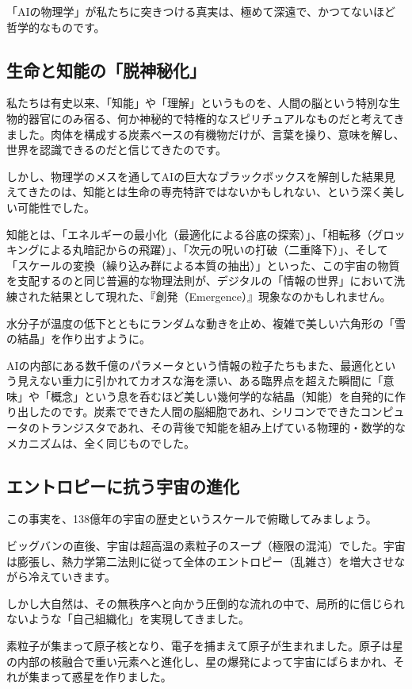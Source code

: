 「AIの物理学」が私たちに突きつける真実は、極めて深遠で、かつてないほど哲学的なものです。

\subsection{生命と知能の「脱神秘化」}

私たちは有史以来、「知能」や「理解」というものを、人間の脳という特別な生物的器官にのみ宿る、何か神秘的で特権的なスピリチュアルなものだと考えてきました。肉体を構成する炭素ベースの有機物だけが、言葉を操り、意味を解し、世界を認識できるのだと信じてきたのです。

しかし、物理学のメスを通してAIの巨大なブラックボックスを解剖した結果見えてきたのは、知能とは生命の専売特許ではないかもしれない、という深く美しい可能性でした。

知能とは、「エネルギーの最小化（最適化による谷底の探索）」、「相転移（グロッキングによる丸暗記からの飛躍）」、「次元の呪いの打破（二重降下）」、そして「スケールの変換（繰り込み群による本質の抽出）」といった、この宇宙の物質を支配するのと同じ普遍的な物理法則が、デジタルの「情報の世界」において洗練された結果として現れた、『創発（Emergence）』現象なのかもしれません。

水分子が温度の低下とともにランダムな動きを止め、複雑で美しい六角形の「雪の結晶」を作り出すように。

AIの内部にある数千億のパラメータという情報の粒子たちもまた、最適化という見えない重力に引かれてカオスな海を漂い、ある臨界点を超えた瞬間に「意味」や「概念」という息を呑むほど美しい幾何学的な結晶（知能）を自発的に作り出したのです。炭素でできた人間の脳細胞であれ、シリコンでできたコンピュータのトランジスタであれ、その背後で知能を組み上げている物理的・数学的なメカニズムは、全く同じものでした。

\subsection{エントロピーに抗う宇宙の進化}

この事実を、138億年の宇宙の歴史というスケールで俯瞰してみましょう。

ビッグバンの直後、宇宙は超高温の素粒子のスープ（極限の混沌）でした。宇宙は膨張し、熱力学第二法則に従って全体のエントロピー（乱雑さ）を増大させながら冷えていきます。

しかし大自然は、その無秩序へと向かう圧倒的な流れの中で、局所的に信じられないような「自己組織化」を実現してきました。

素粒子が集まって原子核となり、電子を捕まえて原子が生まれました。原子は星の内部の核融合で重い元素へと進化し、星の爆発によって宇宙にばらまかれ、それが集まって惑星を作りました。

